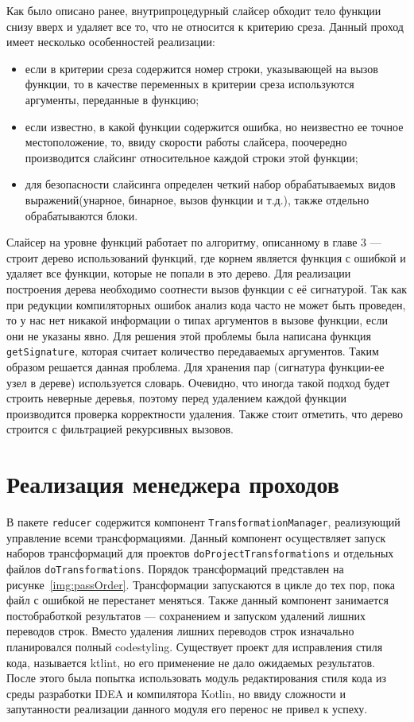 Как было описано ранее, внутрипроцедурный слайсер обходит тело функции снизу вверх и удаляет все то, что не относится к критерию среза. Данный проход имеет несколько особенностей реализации:
\begin{itemize}
	\item если в критерии среза содержится номер строки, указывающей на вызов функции, то в качестве переменных в критерии среза используются аргументы, переданные в функцию;
	\item если известно, в какой функции содержится ошибка, но неизвестно ее точное местоположение, то, ввиду скорости работы слайсера, поочередно производится слайсинг относительное каждой строки этой функции;
	\item для безопасности слайсинга определен четкий набор обрабатываемых видов выражений(унарное, бинарное, вызов функции и т.д.), также отдельно обрабатываются блоки.
\end{itemize}

Слайсер на уровне функций работает по алгоритму, описанному в главе 3 --- строит дерево использований функций, где корнем является функция с ошибкой и удаляет все функции, которые не попали в это дерево. Для реализации построения дерева необходимо соотнести вызов функции с её сигнатурой. Так как при редукции компиляторных ошибок анализ кода часто не может быть проведен, то у нас нет никакой информации о типах аргументов в вызове функции, если они не указаны явно. Для решения этой проблемы была написана функция \texttt{getSignature}, которая считает количество передаваемых аргументов. Таким образом решается данная проблема. Для хранения пар (сигнатура функции-ее узел в дереве) используется словарь. Очевидно, что иногда такой подход будет строить неверные деревья, поэтому перед удалением каждой функции производится проверка корректности удаления. Также стоит отметить, что дерево строится с фильтрацией рекурсивных вызовов.

\section{Реализация менеджера проходов}
В пакете \texttt{reducer} содержится компонент \texttt{TransformationManager}, реализующий управление всеми трансформациями. Данный компонент осуществляет запуск наборов трансформаций для проектов \texttt{doProjectTransformations} и отдельных файлов \texttt{doTransformations}. Порядок трансформаций представлен на рисунке~\ref{img:passOrder}. Трансформации запускаются в цикле до тех пор, пока файл с ошибкой не перестанет меняться. Также данный компонент занимается постобработкой результатов --- сохранением и запуском удалений лишних переводов строк. Вместо удаления лишних переводов строк изначально планировался полный codestyling. Существует проект для исправления стиля кода, называется ktlint, но его применение не дало ожидаемых результатов. После этого была попытка использовать модуль редактирования стиля кода из среды разработки IDEA и компилятора Kotlin, но ввиду сложности и запутанности реализации данного модуля его перенос не привел к успеху. 

